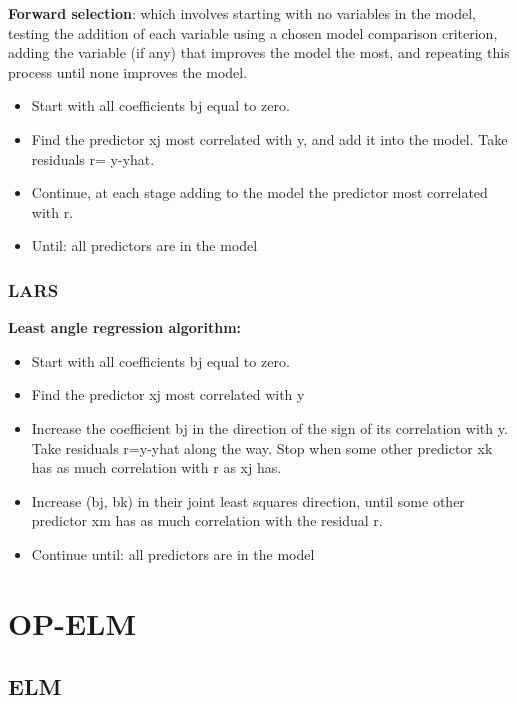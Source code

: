 \documentclass{beamer}
\begin{document}
\begin{frame}
\textbf{ Forward selection}: which involves starting with no variables in the
model, testing the addition of each variable using a chosen model comparison criterion,
adding the variable (if any) that improves the model the most, and repeating
this process until none improves the model.

\begin{itemize}
\item Start with all coefficients bj equal to zero.
\item Find the predictor xj most correlated with y, and add it into the model.
Take residuals r= y-yhat.
\item Continue, at each stage adding to the model the predictor most correlated
with r.
\item Until: all predictors are in the model
\end{itemize}

\end{frame}

\subsubsection{LARS}


\begin{frame}
\textbf{ Least angle regression algorithm:}
	\begin{itemize}
	\item Start with all coefficients bj equal to zero.
	\item Find the predictor xj most correlated with y
	\item Increase the coefficient bj in the direction of the sign of its
	correlation with y. Take residuals r=y-yhat along the way. Stop when some other predictor xk has as much correlation with r as xj has.
	\item Increase (bj, bk) in their joint least squares direction, until some other
	predictor xm has as much correlation with the residual r.
	\item Continue until: all predictors are in the model
	\end{itemize}
\end{frame}


\section{OP-ELM}

\subsection{ELM}
\end{document}
